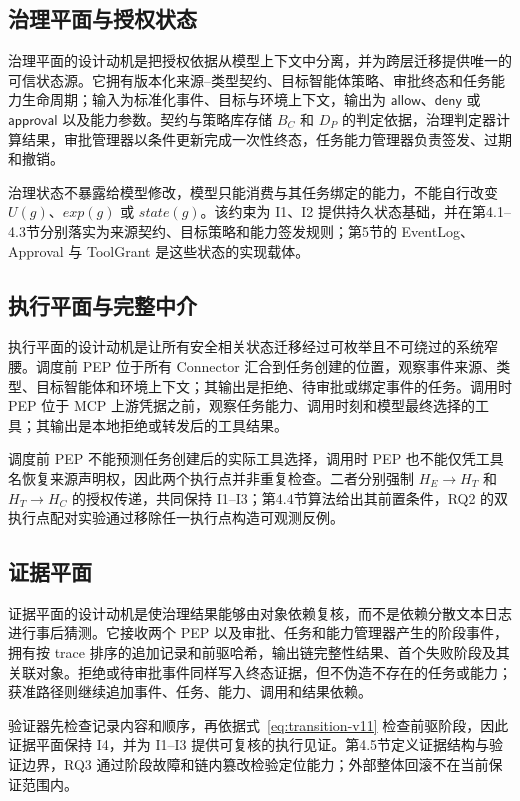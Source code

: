 \subsection{治理平面与授权状态}

治理平面的设计动机是把授权依据从模型上下文中分离，并为跨层迁移提供唯一的可信状态源。它拥有版本化来源--类型契约、目标智能体策略、审批终态和任务能力生命周期；输入为标准化事件、目标与环境上下文，输出为 $\mathsf{allow}$、$\mathsf{deny}$ 或 $\mathsf{approval}$ 以及能力参数。契约与策略库存储 $B_C$ 和 $D_P$ 的判定依据，治理判定器计算结果，审批管理器以条件更新完成一次性终态，任务能力管理器负责签发、过期和撤销。

治理状态不暴露给模型修改，模型只能消费与其任务绑定的能力，不能自行改变 $U(g)$、$exp(g)$ 或 $state(g)$。该约束为 I1、I2 提供持久状态基础，并在第4.1--4.3节分别落实为来源契约、目标策略和能力签发规则；第5节的 EventLog、Approval 与 ToolGrant 是这些状态的实现载体。

\subsection{执行平面与完整中介}

执行平面的设计动机是让所有安全相关状态迁移经过可枚举且不可绕过的系统窄腰。调度前 PEP 位于所有 Connector 汇合到任务创建的位置，观察事件来源、类型、目标智能体和环境上下文；其输出是拒绝、待审批或绑定事件的任务。调用时 PEP 位于 MCP 上游凭据之前，观察任务能力、调用时刻和模型最终选择的工具；其输出是本地拒绝或转发后的工具结果。

调度前 PEP 不能预测任务创建后的实际工具选择，调用时 PEP 也不能仅凭工具名恢复来源声明权，因此两个执行点并非重复检查。二者分别强制 $H_E\rightarrow H_T$ 和 $H_T\rightarrow H_C$ 的授权传递，共同保持 I1--I3；第4.4节算法给出其前置条件，RQ2 的双执行点配对实验通过移除任一执行点构造可观测反例。

\subsection{证据平面}

证据平面的设计动机是使治理结果能够由对象依赖复核，而不是依赖分散文本日志进行事后猜测。它接收两个 PEP 以及审批、任务和能力管理器产生的阶段事件，拥有按 trace 排序的追加记录和前驱哈希，输出链完整性结果、首个失败阶段及其关联对象。拒绝或待审批事件同样写入终态证据，但不伪造不存在的任务或能力；获准路径则继续追加事件、任务、能力、调用和结果依赖。

验证器先检查记录内容和顺序，再依据式~\eqref{eq:transition-v11} 检查前驱阶段，因此证据平面保持 I4，并为 I1--I3 提供可复核的执行见证。第4.5节定义证据结构与验证边界，RQ3 通过阶段故障和链内篡改检验定位能力；外部整体回滚不在当前保证范围内。

